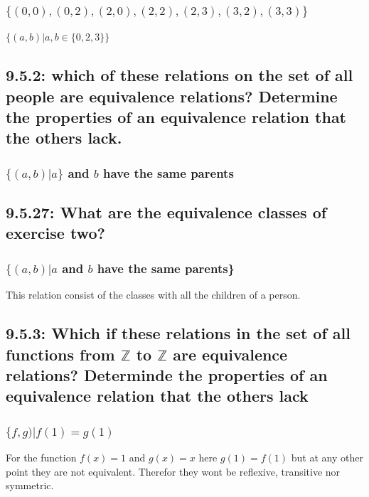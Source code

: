 \documentclass[12pt, a4paper]{report}
\begin{document}
					\subsubsection{$\{(0,0),(0,2),(2,0),(2,2),(2,3),(3,2),(3,3)\}$}
						$\{(a,b)|a,b\in\{0,2,3\}\}$
				\setcounter{subsection}{1}
				\subsection{9.5.2: which of these relations on the set of all people are equivalence relations? Determine the properties of an equivalence relation that the others lack.}
					\setcounter{subsubsection}{1}
					\subsubsection{$\{(a,b)|a\}$ and $b$ have the same parents}
				\setcounter{subsection}{26}
				\subsection{9.5.27: What are the equivalence classes of exercise two?}
					\setcounter{subsubsection}{1}
					\subsubsection{$\{(a,b)|a$ and $b$ have the same parents\}}
						This relation consist of the classes with all the children of a person.
				\setcounter{subsection}{2}
				\subsection{9.5.3: Which if these relations in the set of all functions from $\mathbb{Z}$ to $\mathbb{Z}$ are equivalence relations? Determinde the properties of an equivalence relation that the others lack}
					\subsubsection{$\{f,g)|f(1)=g(1)$}
						For the function $f(x)=1$ and $g(x)=x$ here $g(1)=f(1)$ but at any other point they are not equivalent. Therefor they wont be reflexive, transitive nor symmetric.
				\setcounter{subsection}{20}
\end{document}
